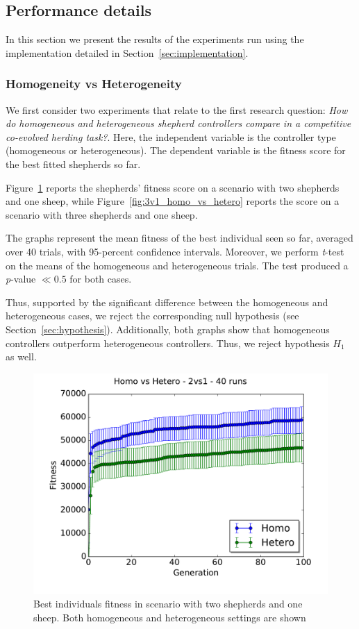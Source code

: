 \documentclass[conference]{IEEEtran}
\begin{document}
\subsection{Performance details}
\label{sec:experiments_performances}
In this section we present the results of the experiments run using the implementation detailed in Section~\ref{sec:implementation}.
\vspace{0.5em}
\subsubsection{Homogeneity vs Heterogeneity}
We first consider two experiments that relate to the first research question: \textit{How do homogeneous and heterogeneous shepherd controllers compare in a competitive co-evolved herding task?}. 
Here, the independent variable is the controller type (homogeneous or heterogeneous). The dependent variable is the fitness score for the best fitted shepherds so far. 

Figure~\ref{fig:2v1_homo_vs_hetero} reports the shepherds' fitness score on a scenario with two shepherds and one sheep, while Figure~\ref{fig:3v1_homo_vs_hetero} reports the score on a scenario with three shepherds and one sheep.

The graphs represent the mean fitness of the best individual seen so far, averaged over 40 trials, with 95-percent confidence intervals.
Moreover, we perform \textit{t}-test on the means of the homogeneous and heterogeneous trials. The test  produced a \textit{p}-value $\ll0.5$ for both cases.

Thus, supported by the significant difference between the homogeneous and heterogeneous cases, we reject the corresponding null hypothesis (see Section~\ref{sec:hypothesis}).
Additionally, both graphs show that homogeneous controllers outperform heterogeneous controllers. Thus, we reject hypothesis $H_1$ as well.

\begin{figure}[ht]
	\centering
	\includegraphics[width=1\hsize]{imgs/homo2v1-hetero2v1-bestSoFar.pdf}
	\caption{Best individuals fitness in scenario with two shepherds and one sheep. Both homogeneous and heterogeneous settings are shown}
	\label{fig:2v1_homo_vs_hetero}
\end{figure}
\end{document}
